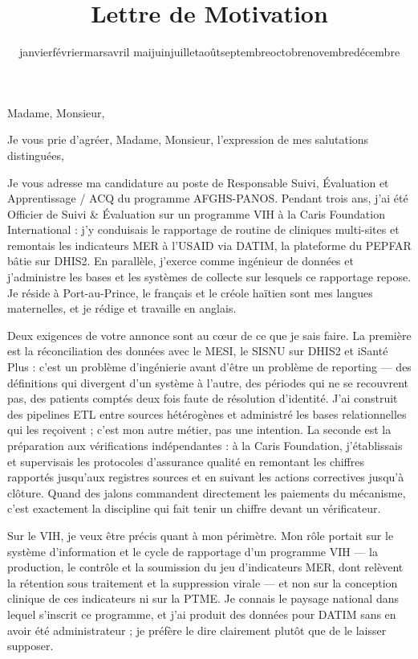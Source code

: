\documentclass[11pt,a4paper,sans]{moderncv}
\title{Lettre de Motivation}
\renewcommand{\today}{\number\day\space\ifcase\month\or janvier\or février\or mars\or avril\or
mai\or juin\or juillet\or août\or septembre\or octobre\or novembre\or décembre\fi\space\number\year}
\begin{document}
\date{\today}
\opening{Madame, Monsieur,}
\closing{Je vous prie d'agréer, Madame, Monsieur, l'expression de mes salutations distinguées,}

\makelettertitle

Je vous adresse ma candidature au poste de Responsable Suivi, Évaluation et Apprentissage / ACQ du programme AFGHS-PANOS. Pendant trois ans, j'ai été Officier de Suivi \& Évaluation sur un programme VIH à la Caris Foundation International : j'y conduisais le rapportage de routine de cliniques multi-sites et remontais les indicateurs MER à l'USAID via DATIM, la plateforme du PEPFAR bâtie sur DHIS2. En parallèle, j'exerce comme ingénieur de données et j'administre les bases et les systèmes de collecte sur lesquels ce rapportage repose. Je réside à Port-au-Prince, le français et le créole haïtien sont mes langues maternelles, et je rédige et travaille en anglais.

Deux exigences de votre annonce sont au cœur de ce que je sais faire. La première est la réconciliation des données avec le MESI, le SISNU sur DHIS2 et iSanté Plus : c'est un problème d'ingénierie avant d'être un problème de reporting --- des définitions qui divergent d'un système à l'autre, des périodes qui ne se recouvrent pas, des patients comptés deux fois faute de résolution d'identité. J'ai construit des pipelines ETL entre sources hétérogènes et administré les bases relationnelles qui les reçoivent ; c'est mon autre métier, pas une intention. La seconde est la préparation aux vérifications indépendantes : à la Caris Foundation, j'établissais et supervisais les protocoles d'assurance qualité en remontant les chiffres rapportés jusqu'aux registres sources et en suivant les actions correctives jusqu'à clôture. Quand des jalons commandent directement les paiements du mécanisme, c'est exactement la discipline qui fait tenir un chiffre devant un vérificateur.

Sur le VIH, je veux être précis quant à mon périmètre. Mon rôle portait sur le système d'information et le cycle de rapportage d'un programme VIH --- la production, le contrôle et la soumission du jeu d'indicateurs MER, dont relèvent la rétention sous traitement et la suppression virale --- et non sur la conception clinique de ces indicateurs ni sur la PTME. Je connais le paysage national dans lequel s'inscrit ce programme, et j'ai produit des données pour DATIM sans en avoir été administrateur ; je préfère le dire clairement plutôt que de le laisser supposer.
\end{document}
